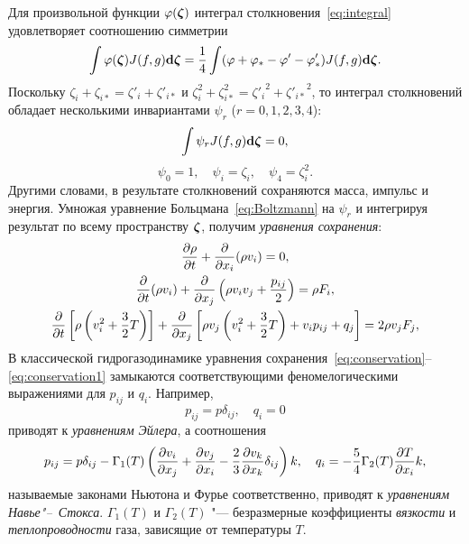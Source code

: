 Для произвольной функции \(\phi(\bzeta)\) интеграл столкновения~\eqref{eq:integral}
удовлетворяет соотношению симметрии
\begin{equation}\label{eq:ci_symmetry}
    \int\phi(\bzeta)J(f,g)\dzeta = \frac14\int(\phi+\phi_*-\phi'-\phi'_*) J(f,g)\dzeta.
\end{equation}
Поскольку \(\zeta_i+\zeta_{i*}=\zeta'_i+\zeta'_{i*}\) и \(\zeta_i^2+\zeta_{i*}^2={\zeta'_i}^2+{\zeta'_{i*}}^{\!\!2}\),
то интеграл столкновений обладает несколькими инвариантами \(\psi_r\) (\(r=0, 1, 2, 3, 4\)):
\begin{equation}\label{eq:conser_moments}
    \int \psi_r J(f,g)\dzeta = 0,
\end{equation}
\begin{equation}\label{eq:def_psi}
    \psi_0 = 1, \quad \psi_i = \zeta_i, \quad \psi_4 = \zeta_i^2.
\end{equation}
Другими словами, в результате столкновений сохраняются масса, импульс и энергия.
Умножая уравнение Больцмана~\eqref{eq:Boltzmann} на \(\psi_r\)
и интегрируя результат по всему пространству \(\bzeta\), получим \emph{уравнения сохранения}:
\begin{gather}\label{eq:conservation}
    \pder[\rho]{t} + \pder{x_i}(\rho v_i) = 0, \\
    \pder{t}(\rho v_i) + \pder{x_j}\left( \rho v_i v_j + \frac{p_{ij}}2 \right) = \rho F_i, \\
    \pder{t}\left[ \rho\left( v_i^2 + \frac32T \right) \right]
        + \pder{x_j}\left[ \rho v_j\left( v_i^2 + \frac32T \right) + v_i p_{ij} + q_j \right]
        = 2\rho v_j F_j, \label{eq:conservation1}
\end{gather}
В классической гидрогазодинамике уравнения сохранения~\eqref{eq:conservation}--\eqref{eq:conservation1}
замыкаются соответствующими феномелогическими выражениями для \(p_{ij}\) и \(q_i\). Например,
\begin{equation}\label{eq:Euler}
    p_{ij} = p\delta_{ij}, \quad q_i = 0
\end{equation}
приводят к \emph{уравнениям Эйлера}, а соотношения
\begin{equation}\label{eq:Navier-Stokes}
    p_{ij} = p\delta_{ij} - \Gamma_1(T)\left( \pder[v_i]{x_j} + \pder[v_j]{x_i}
        - \frac23\pder[v_k]{x_k}\delta_{ij} \right)k, \quad
    q_i = -\frac54\Gamma_2(T)\pder[T]{x_i}k,
\end{equation}
называемые законами Ньютона и Фурье соответственно,
приводят к \emph{уравнениям Навье"--~Стокса}.
\(\Gamma_1(T)\) и \(\Gamma_2(T)\) "--- безразмерные коэффициенты \emph{вязкости}
и \emph{теплопроводности} газа, зависящие от температуры \(T\).

